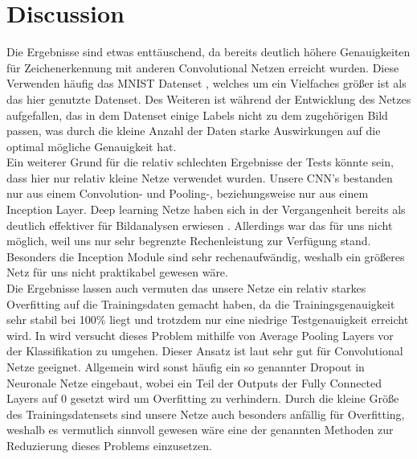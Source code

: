 \documentclass[runningheads,a4paper]{llncs}[2015/06/24]
\begin{document}
\section{Discussion}\label{sec:Discussion}
Die Ergebnisse sind etwas enttäuschend, da bereits deutlich höhere Genauigkeiten für Zeichenerkennung mit anderen Convolutional Netzen erreicht wurden. Diese Verwenden häufig das MNIST Datenset \cite{mnist}, welches um ein Vielfaches größer ist als das hier genutzte Datenset. Des Weiteren ist während der Entwicklung des Netzes aufgefallen, das in dem Datenset einige Labels nicht zu dem zugehörigen Bild passen, was durch die kleine Anzahl der Daten starke Auswirkungen auf die optimal mögliche Genauigkeit hat.\\
Ein weiterer Grund für die relativ schlechten Ergebnisse der Tests könnte sein, dass hier nur relativ kleine Netze verwendet wurden. Unsere CNN's bestanden nur aus einem Convolution- und Pooling-, beziehungsweise nur aus einem Inception Layer. Deep learning Netze haben sich in der Vergangenheit bereits als deutlich effektiver für Bildanalysen erwiesen \cite{deep_conv}. Allerdings war das für uns nicht möglich, weil uns nur sehr begrenzte Rechenleistung zur Verfügung stand. Besonders die Inception Module sind sehr rechenaufwändig, weshalb ein größeres Netz für uns nicht praktikabel gewesen wäre.\\
Die Ergebnisse lassen auch vermuten das unsere Netze ein relativ starkes Overfitting auf die Trainingsdaten gemacht haben, da die Trainingsgenauigkeit sehr stabil bei 100\% liegt und trotzdem nur eine niedrige Testgenauigkeit erreicht wird. In \cite{inception_paper} wird versucht dieses Problem mithilfe von Average Pooling Layers vor der Klassifikation zu umgehen. Dieser Ansatz ist laut \cite{average_pooling_paper} sehr gut für Convolutional Netze geeignet. Allgemein wird sonst häufig ein so genannter Dropout in Neuronale Netze eingebaut, wobei ein Teil der Outputs der Fully Connected Layers auf 0 gesetzt wird um Overfitting zu verhindern. Durch die kleine Größe des Trainingsdatensets sind unsere Netze auch besonders anfällig für Overfitting, weshalb es vermutlich sinnvoll gewesen wäre eine der genannten Methoden zur Reduzierung dieses Problems einzusetzen.\\
\end{document}
